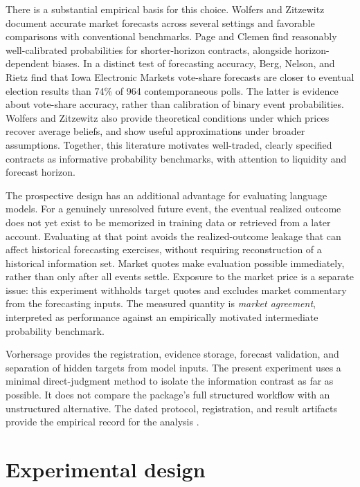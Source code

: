 \documentclass[11pt,letterpaper]{article}
\begin{document}
There is a substantial empirical basis for this choice. Wolfers and Zitzewitz
\cite{wolfers2004} document accurate market forecasts across several settings
and favorable comparisons with conventional benchmarks. Page and Clemen
\cite{page2013} find reasonably well-calibrated probabilities for shorter-horizon
contracts, alongside horizon-dependent biases. In a distinct test of
forecasting accuracy, Berg, Nelson, and Rietz \cite{berg2008} find that Iowa
Electronic Markets vote-share forecasts are closer to eventual election
results than 74\% of 964 contemporaneous polls. The latter is evidence about
vote-share accuracy, rather than calibration of binary event probabilities.
Wolfers and Zitzewitz \cite{wolfers2006} also provide theoretical conditions
under which prices recover average beliefs, and show useful approximations
under broader assumptions. Together, this literature motivates well-traded,
clearly specified contracts as informative probability benchmarks, with
attention to liquidity and forecast horizon.

The prospective design has an additional advantage for evaluating language
models. For a genuinely unresolved future event, the eventual realized outcome
does not yet exist to be memorized in training data or retrieved from a later
account. Evaluating at that point avoids the realized-outcome leakage that can
affect historical forecasting exercises, without requiring reconstruction of
a historical information set. Market quotes make evaluation possible
immediately, rather than only after all events settle. Exposure to the market
price is a separate issue: this experiment withholds target quotes and excludes
market commentary from the forecasting inputs. The measured quantity is
\emph{market agreement}, interpreted as performance against an empirically
motivated intermediate probability benchmark.

Vorhersage provides the registration, evidence storage, forecast validation,
and separation of hidden targets from model inputs. The present experiment
uses a minimal direct-judgment method to isolate the information contrast as
far as possible. It does not compare the package's full structured workflow
with an unstructured alternative. The dated protocol, registration, and
result artifacts provide the empirical record for the analysis
\cite{protocol,results}.

\section{Experimental design}
\end{document}
